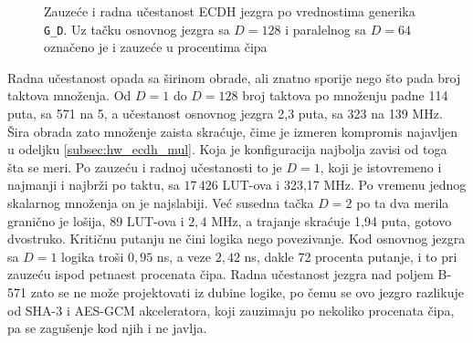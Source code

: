 \begin{figure}[H]
\caption{Zauzeće i radna učestanost ECDH jezgra po vrednostima generika \texttt{G\_D}. Uz tačku osnovnog jezgra sa $D = 128$ i paralelnog sa $D = 64$ označeno je i zauzeće u procentima čipa}
\label{fig:ecdh_pareto}
\end{figure}

Radna učestanost opada sa širinom obrade, ali znatno sporije nego što pada broj taktova množenja. Od $D = 1$ do $D = 128$ broj taktova po množenju padne 114 puta, sa 571 na 5, a učestanost osnovnog jezgra 2,3 puta, sa 323 na 139 MHz. Šira obrada zato množenje zaista skraćuje, čime je izmeren kompromis najavljen u odeljku \ref{subsec:hw_ecdh_mul}. Koja je konfiguracija najbolja zavisi od toga šta se meri. Po zauzeću i radnoj učestanosti to je $D = 1$, koji je istovremeno i najmanji i najbrži po taktu, sa $17\,426$ LUT-ova i 323,17 MHz. Po vremenu jednog skalarnog množenja on je najslabiji. Već susedna tačka $D = 2$ po ta dva merila granično je lošija, 89 LUT-ova i $2{,}4$ MHz, a trajanje skraćuje 1,94 puta, gotovo dvostruko.
\smallbreak
Kritičnu putanju ne čini logika nego povezivanje. Kod osnovnog jezgra sa $D = 1$ logika troši $0{,}95$ ns, a veze $2{,}42$ ns, dakle 72 procenta putanje, i to pri zauzeću ispod petnaest procenata čipa. Radna učestanost jezgra nad poljem B-571 zato se ne može projektovati iz dubine logike, po čemu se ovo jezgro razlikuje od SHA-3 i AES-GCM akceleratora, koji zauzimaju po nekoliko procenata čipa, pa se zagušenje kod njih i ne javlja.


